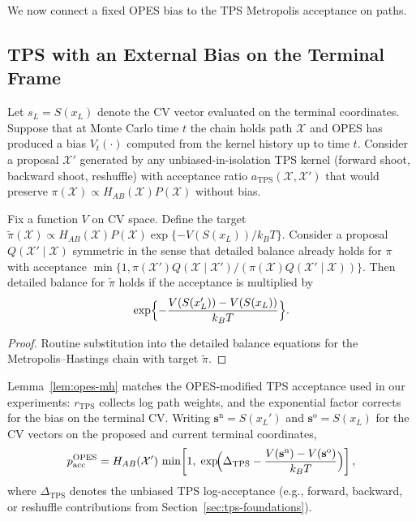 We now connect a fixed OPES bias to the TPS Metropolis acceptance on paths.

\subsection{TPS with an External Bias on the Terminal Frame}

Let $s_L = S(x_L)$ denote the CV vector evaluated on the terminal coordinates. Suppose that at Monte Carlo time $t$ the chain holds path $\mathcal{X}$ and OPES has produced a bias $V_t(\cdot)$ computed from the kernel history up to time $t$. Consider a proposal $\mathcal{X}'$ generated by any unbiased-in-isolation TPS kernel (forward shoot, backward shoot, reshuffle) with acceptance ratio $a_{\mathrm{TPS}}(\mathcal{X}, \mathcal{X}')$ that would preserve $\pi(\mathcal{X}) \propto H_{AB}(\mathcal{X}) P(\mathcal{X})$ without bias.

\begin{lemma}
\label{lem:opes-mh}
Fix a function $V$ on CV space. Define the target $\tilde{\pi}(\mathcal{X}) \propto H_{AB}(\mathcal{X}) P(\mathcal{X}) \exp\{- V(S(x_L)) / k_BT\}$. Consider a proposal $Q(\mathcal{X}'\mid \mathcal{X})$ symmetric in the sense that detailed balance already holds for $\pi$ with acceptance $\min\{1, \pi(\mathcal{X}')Q(\mathcal{X}\mid\mathcal{X}')/(\pi(\mathcal{X})Q(\mathcal{X}'\mid\mathcal{X}))\}$. Then detailed balance for $\tilde{\pi}$ holds if the acceptance is multiplied by
\[
  \exp\Bigl\{ - \frac{V(S(x'_L)) - V(S(x_L))}{k_BT} \Bigr\}.
\]
\end{lemma}

\begin{proof}
Routine substitution into the detailed balance equations for the Metropolis--Hastings chain with target $\tilde{\pi}$.
\end{proof}

Lemma~\ref{lem:opes-mh} matches the OPES-modified TPS acceptance used in our experiments: $r_{\mathrm{TPS}}$ collects log path weights, and the exponential factor corrects for the bias on the terminal CV. Writing $\mathbf{s}^{\mathrm{n}} = S(x_L')$ and $\mathbf{s}^{\mathrm{o}} = S(x_L)$ for the CV vectors on the proposed and current terminal coordinates,
\begin{equation}
  \label{eq:tps-opes}
  p_{\mathrm{acc}}^{\mathrm{OPES}}
  = H_{AB}(\mathcal{X}')\,
    \min\!\left[
      1,\;
      \exp\!\Bigl(
        \Delta_{\mathrm{TPS}}
        - \frac{V(\mathbf{s}^{\mathrm{n}}) - V(\mathbf{s}^{\mathrm{o}})}{k_BT}
      \Bigr)
    \right],
\end{equation}
where $\Delta_{\mathrm{TPS}}$ denotes the unbiased TPS log-acceptance (e.g., forward, backward, or reshuffle contributions from Section~\ref{sec:tps-foundations}).

